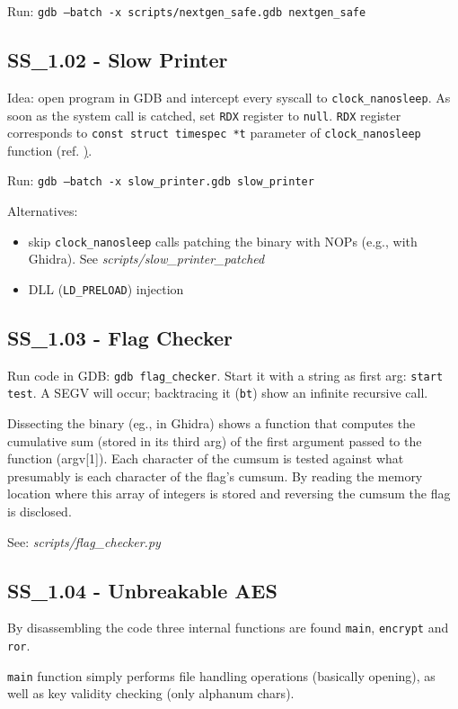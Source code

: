 Run: \texttt{gdb --batch -x scripts/nextgen_safe.gdb nextgen_safe}

\subsection{SS_1.02 - Slow Printer}
Idea: open program in GDB and intercept every syscall to \texttt{clock_nanosleep}.
As soon as the system call is catched, set \texttt{RDX} register to \texttt{null}.
\texttt{RDX} register corresponds to \texttt{const struct timespec *t} parameter of \texttt{clock_nanosleep} function (ref. \href{https://man7.org/linux/man-pages/man2/clock_nanosleep.2.html}).

Run: \texttt{gdb --batch -x slow_printer.gdb slow_printer}

Alternatives:
\begin{itemize}
  \item skip \texttt{clock_nanosleep} calls patching the binary with NOPs (e.g., with Ghidra). See \textit{scripts/slow_printer_patched}
  \item DLL (\texttt{LD_PRELOAD}) injection
\end{itemize}

\subsection{SS_1.03 - Flag Checker}
Run code in GDB: \texttt{gdb flag_checker}.
Start it with a string as first arg: \texttt{start test}.
A SEGV will occur; backtracing it (\texttt{bt}) show an infinite recursive call.

Dissecting the binary (eg., in Ghidra) shows a function that computes the cumulative sum (stored in its third arg) of the first argument passed to the function (argv[1]).
Each character of the cumsum is tested against what presumably is each character of the flag's cumsum.
By reading the memory location where this array of integers is stored and reversing the cumsum the flag is disclosed.

See: \textit{scripts/flag_checker.py}

\subsection{SS_1.04 - Unbreakable AES}
By disassembling the code three internal functions are found \texttt{main}, \texttt{encrypt} and \texttt{ror}.

\texttt{main} function simply performs file handling operations (basically opening), as well as key validity checking (only alphanum chars).

